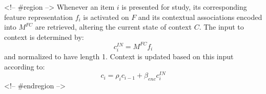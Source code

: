 {}<!-- #region -->\markdownRendererInterblockSeparator
{}\markdownRendererInterblockSeparator
{}Whenever an item $i$ is presented for study, its corresponding feature representation $f_i$ is activated on $F$ and its contextual associations encoded into $M^{FC}$ are retrieved, altering the current state of context $C$.\markdownRendererInterblockSeparator
{}The input to context is determined by:\markdownRendererInterblockSeparator
{}\begin{equation} \label{eq:3} c^{IN}_{i} = M^{FC}f_{i} \end{equation}\markdownRendererInterblockSeparator
{}and normalized to have length 1. Context is updated based on this input according to:\markdownRendererInterblockSeparator
{}$$c_i = \rho_ic_{i-1} + \beta_{enc} c_{i}^{IN}$$\markdownRendererInterblockSeparator
{}<!-- #endregion -->\relax